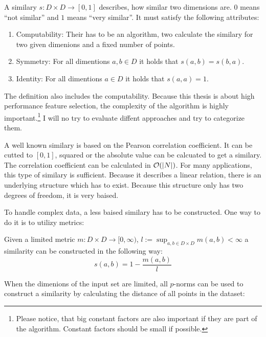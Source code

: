 \begin{envdef}[Similarity]
	A similary $s : D \times D \rightarrow [0,1]$ describes, how similar two dimensions are. $0$ means ``not similar'' and $1$ means ``very similar''. It must satisfy the following attributes:
	\begin{enumerate}
		\item Computability: Their has to be an algorithm, two calculate the similary for two given dimenions and a fixed number of points.
		\item Symmetry: For all dimentions $a,b \in D$ it holds that $s(a,b) = s(b,a)$.
		\item Identity: For all dimentions $a \in D$ it holds that $s(a,a) = 1$.
	\end{enumerate}
\end{envdef}

The definition also includes the computability. Because this thesis is about high performance feature selection, the complexity of the algorithm is highly important.\footnote{Please notice, that big constant factors are also important if they are part of the algorithm. Constant factors should be small if possible.} I will no try to evaluate diffent approaches and try to categorize them.

A well known similary is based on the Pearson correlation coefficient. It can be cutted to $[0,1]$, squared or the absolute value can be calcuated to get a similary. The correlation coefficient can be calculated in $\mathcal{O}(\left|N\right|)$. For many applications, this type of similary is sufficient. Because it describes a linear relation, there is an underlying structure which has to exist. Because this structure only has two degrees of freedom, it is very baised.

To handle complex data, a less baised similary has to be constructed. One way to do it is to utilizy metrics:

\begin{envtheo}
	Given a limited metric $m : D \times D \rightarrow [0,\infty)$, $l := \sup_{a,b \in D \times D} m(a,b) < \infty$ a similarity can be constructed in the following way:
	\begin{equation}
		s(a,b) = 1 - \frac{m(a,b)}{l}
	\end{equation}
\end{envtheo}

When the dimenions of the input set are limited, all $p$-norms can be used to construct a similarity by calculating the distance of all points in the dataset:

